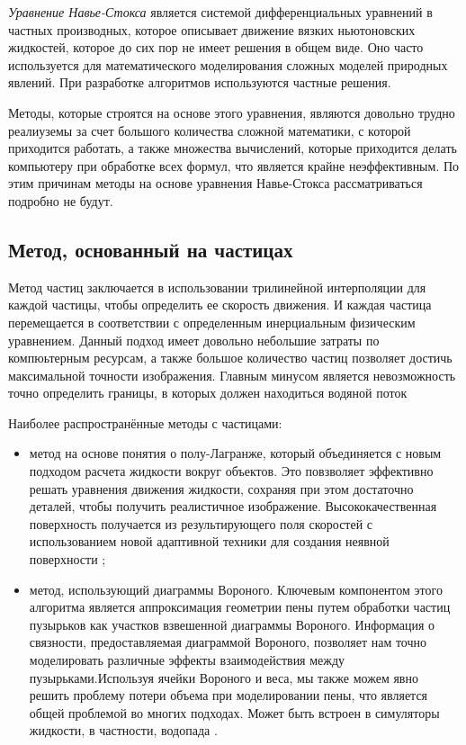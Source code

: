 \textit{Уравнение Навье-Стокса} \cite{navier-stokes} является системой дифференциальных уравнений в частных производных, которое описывает движение вязких ньютоновских жидкостей, которое до сих пор не имеет решения в общем виде. Оно часто используется для математического моделирования сложных моделей природных явлений. При разработке алгоритмов используются частные решения.

Методы, которые строятся на основе этого уравнения, являются довольно трудно реалиуземы за счет большого количества сложной математики, с которой приходится работать, а также множества вычислений, которые приходится делать компьютеру при обработке всех формул, что является крайне неэффективным. По этим причинам методы на основе уравнения Навье-Стокса рассматриваться подробно не будут. \cite{navier-stokes-cg}

\subsection{Метод, основанный на частицах}

Метод частиц заключается в использовании трилинейной интерполяции для каждой частицы, чтобы определить ее скорость движения. И каждая частица перемещается в соответствии с определенным инерциальным физическим уравнением. Данный подход имеет довольно небольшие затраты по компюьтерным ресурсам, а также большое количество частиц позволяет достичь максимальной точности изображения. Главным минусом является невозможность точно определить границы, в которых должен находиться водяной поток

Наиболее распространённые методы с частицами:
\begin{itemize}
    \item метод на основе понятия о полу-Лагранже, который объединяется с новым подходом расчета жидкости вокруг объектов. Это повзволяет эффективно решать уравнения движения жидкости, сохраняя при этом достаточно деталей, чтобы получить реалистичное изображение. Высококачественная поверхность получается из результирующего поля скоростей с использованием новой адаптивной техники для создания неявной поверхности  \cite{semi-lagrangian-particle};
    \item метод, использующий диаграммы Вороного. Ключевым компонентом этого алгоритма является аппроксимация геометрии пены путем обработки частиц пузырьков как участков взвешенной диаграммы Вороного. Информация о связности, предоставляемая диаграммой Вороного, позволяет нам точно моделировать различные эффекты взаимодействия между пузырьками.Используя ячейки Вороного и веса, мы также можем явно решить проблему потери объема при моделировании пены, что является общей проблемой во многих подходах. Может быть встроен в симуляторы жидкости, в частности, водопада \cite{voronov-diagram-particle}.
\end{itemize}

